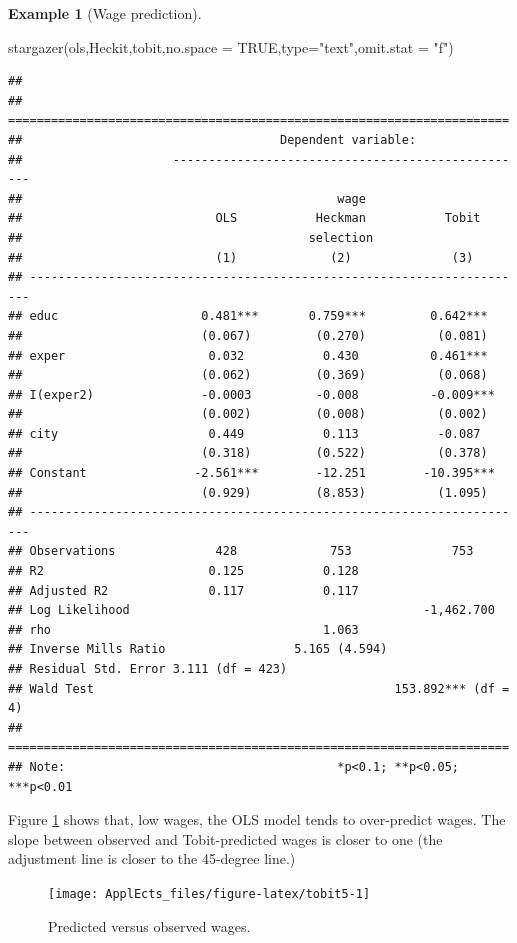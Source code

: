 \documentclass[
  12pt,
]{book}
\newenvironment{Shaded}{\begin{snugshade}}{\end{snugshade}}
\newcommand{\AttributeTok}[1]{\textcolor[rgb]{0.77,0.63,0.00}{#1}}
\newcommand{\ConstantTok}[1]{\textcolor[rgb]{0.00,0.00,0.00}{#1}}
\newcommand{\FunctionTok}[1]{\textcolor[rgb]{0.00,0.00,0.00}{#1}}
\newcommand{\NormalTok}[1]{#1}
\newcommand{\StringTok}[1]{\textcolor[rgb]{0.31,0.60,0.02}{#1}}
\theoremstyle{definition}
\theoremstyle{definition}
\newtheorem{example}{Example}[chapter]
\theoremstyle{definition}
\theoremstyle{definition}
\theoremstyle{remark}
\begin{document}
\begin{example}[Wage prediction]
\begin{Shaded}
\begin{Highlighting}[]
\FunctionTok{stargazer}\NormalTok{(ols,Heckit,tobit,}\AttributeTok{no.space =} \ConstantTok{TRUE}\NormalTok{,}\AttributeTok{type=}\StringTok{"text"}\NormalTok{,}\AttributeTok{omit.stat =} \StringTok{"f"}\NormalTok{)}
\end{Highlighting}
\end{Shaded}

\begin{verbatim}
## 
## ======================================================================
##                                    Dependent variable:                
##                     --------------------------------------------------
##                                            wage                       
##                           OLS           Heckman           Tobit       
##                                        selection                      
##                           (1)             (2)              (3)        
## ----------------------------------------------------------------------
## educ                    0.481***       0.759***         0.642***      
##                         (0.067)         (0.270)          (0.081)      
## exper                    0.032           0.430          0.461***      
##                         (0.062)         (0.369)          (0.068)      
## I(exper2)               -0.0003         -0.008          -0.009***     
##                         (0.002)         (0.008)          (0.002)      
## city                     0.449           0.113           -0.087       
##                         (0.318)         (0.522)          (0.378)      
## Constant               -2.561***        -12.251        -10.395***     
##                         (0.929)         (8.853)          (1.095)      
## ----------------------------------------------------------------------
## Observations              428             753              753        
## R2                       0.125           0.128                        
## Adjusted R2              0.117           0.117                        
## Log Likelihood                                         -1,462.700     
## rho                                      1.063                        
## Inverse Mills Ratio                  5.165 (4.594)                    
## Residual Std. Error 3.111 (df = 423)                                  
## Wald Test                                          153.892*** (df = 4)
## ======================================================================
## Note:                                      *p<0.1; **p<0.05; ***p<0.01
\end{verbatim}

Figure \ref{fig:tobit5} shows that, low wages, the OLS model tends to over-predict wages. The slope between observed and Tobit-predicted wages is closer to one (the adjustment line is closer to the 45-degree line.)

\begin{figure}
\texttt{[image: ApplEcts\_files/figure-latex/tobit5-1]} \caption{Predicted versus observed wages.}\label{fig:tobit5}
\end{figure}

\end{example}
\end{document}
